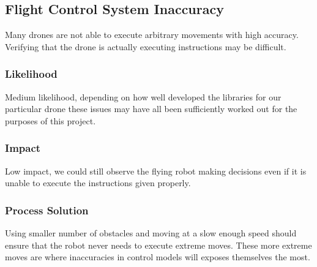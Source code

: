 \documentclass{article}
\begin{document}
	\subsection{Flight Control System Inaccuracy}
	
	Many drones are not able to execute arbitrary movements with high accuracy. Verifying that the drone is actually executing instructions may be difficult. 
	
		\subsubsection{Likelihood}
		
		Medium likelihood, depending on how well developed the libraries for our particular drone these issues may have all been sufficiently worked out for the purposes of this project.
		
		\subsubsection{Impact}
		
		Low impact, we could still observe the flying robot making decisions even if it is unable to execute the instructions given properly.
		
		\subsubsection{Process Solution}
		
		Using smaller number of obstacles and moving at a slow enough speed should ensure that the robot never needs to execute extreme moves. These more extreme moves are where inaccuracies in control models will exposes themselves the most. 
	
\end{document}
